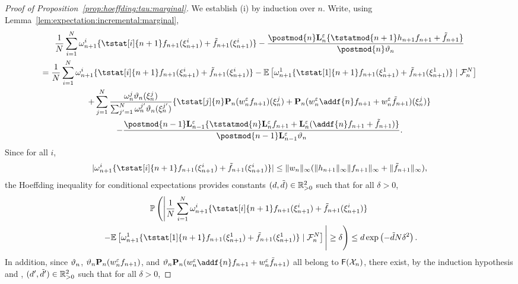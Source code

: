 \begin{proof}[Proof of Proposition~\ref{prop:hoeffding:tau:marginal}]
We establish (i) by induction over $n$. Write, using Lemma~\ref{lem:expectation:incremental:marginal},
\begin{multline} \label{eq:hoeffding:decomp}
\frac{1}{\N} \sum_{i = 1}^\N \ewght{n + 1}{i} \{\tstat[i]{n + 1} f_{n + 1}(\epart{n + 1}{i}) + \ftd{n + 1}(\epart{n + 1}{i})\} - \frac{\postmod{n} \ukmod{n} \{ \tstatmod{n + 1} h_{n + 1} f_{n + 1} + \ftd{n + 1} \}}{\postmod{n} \adjfuncforward{n}}  \\
= \frac{1}{\N} \sum_{i = 1}^\N \ewght{n + 1}{i} \{\tstat[i]{n + 1} f_{n + 1}(\epart{n + 1}{i}) + \ftd{n + 1}(\epart{n + 1}{i})\} - \pE \left[ \ewght{n + 1}{1} \{\tstat[1]{n + 1} f_{n + 1}(\epart{n + 1}{1}) + \ftd{n + 1}(\epart{n + 1}{1})\} \cond \calF{n}{\N} \right] \\
+ \sum_{j = 1}^\N 
\frac{\ewght{n}{j} \adjfuncforward{n}(\epart{n}{j})}{\sum_{j' = 1}^\N \ewght{n}{j'} \adjfuncforward{n}(\epart{n}{j'})} \{ \tstat[j]{n} \prop{n} (\wgtfuncmod{n} f_{n + 1})(\epart{n}{j}) + \prop{n}(\wgtfuncmod{n} \addf{n} f_{n + 1} + \wgtfuncmod{n} \ftd{n + 1})(\epart{n}{j})\} \\
- \frac{\postmod{n - 1} \ukmod{n - 1}\{\tstatmod{n} \ukmod{n} f_{n + 1} + \ukmod{n} (\addf{n} f_{n + 1} + \ftd{n + 1})\}}{\postmod{n - 1} \ukmod{n - 1} \adjfuncforward{n}}. 
\end{multline}
Since for all $i$, 
$$
|\ewght{n + 1}{i} \{\tstat[i]{n + 1} f_{n + 1}(\epart{n + 1}{i}) + \ftd{n + 1}(\epart{n + 1}{i})\}| \leq \| \wgtfunc{n} \|_\infty (\| h_{n + 1} \|_\infty \| f_{n + 1} \|_\infty + \| \ftd{n + 1} \|_\infty), 
$$
the Hoeffding inequality for conditional expectations provides constants $(d, \tilde{d}) \in \mathbb{R}_{> 0}^2$ such that for all $\delta > 0$, 
\begin{multline*}
\pP \left( \left| \frac{1}{\N} \sum_{i = 1}^\N \ewght{n + 1}{i} \{\tstat[i]{n + 1} f_{n + 1}(\epart{n + 1}{i}) + \ftd{n + 1}(\epart{n + 1}{i})\} \right. \right. \\
\left. \left.  - \pE \left[ \ewght{n + 1}{1} \{\tstat[1]{n + 1} f_{n + 1}(\epart{n + 1}{1}) + \ftd{n + 1}(\epart{n + 1}{1})\} \cond \calF{n}{\N} \right] \vphantom{\sum_{i = 1}^\N} \right| \geq \delta \right) \leq d \exp \left( - \tilde{d} N \delta^2 \right).  
\end{multline*}
In addition, since $\vartheta_{n}$, $\vartheta_{n} \mathbf{P}_{n} (w^{\varepsilon}_{n} f_{n + 1})$, and $\adjfuncforward{n} \prop{n}(\wgtfuncmod{n} \addf{n} f_{n + 1} + \wgtfuncmod{n} \ftd{n + 1})$ all belong to $\mathsf{F}(\mathcal{X}_n)$, there exist, by the induction hypothesis and \cite[Lemma~4]{douc:garivier:moulines:olsson:2010}, $(d', \tilde{d}') \in \mathbb{R}_{> 0}^2$ such that for all $\delta > 0$, 

\end{proof}
